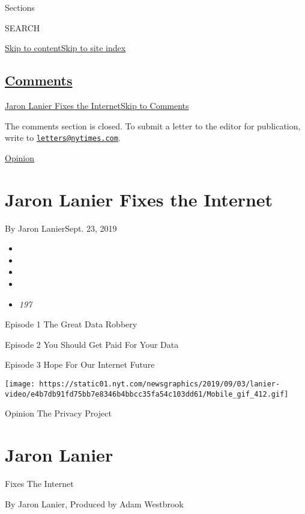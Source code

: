 Sections

SEARCH

\protect\hyperlink{site-content}{Skip to
content}\protect\hyperlink{site-index}{Skip to site index}

\hypertarget{comments}{%
\subsection{\texorpdfstring{\protect\hyperlink{commentsContainer}{Comments}}{Comments}}\label{comments}}

\href{}{Jaron Lanier Fixes the Internet}\href{}{Skip to Comments}

The comments section is closed. To submit a letter to the editor for
publication, write to
\href{mailto:letters@nytimes.com}{\nolinkurl{letters@nytimes.com}}.

\href{/section/opinion}{Opinion}

\hypertarget{jaron-lanier-fixes-the-internet}{%
\section{Jaron Lanier Fixes the
Internet}\label{jaron-lanier-fixes-the-internet}}

By Jaron LanierSept. 23, 2019

\begin{itemize}
\item
\item
\item
\item
\item
  \emph{197}
\end{itemize}

 Episode 1 The Great Data Robbery

 Episode 2 You Should Get Paid For Your Data

 Episode 3 Hope For Our Internet Future

\texttt{[image: https://static01.nyt.com/newsgraphics/2019/09/03/lanier-video/e4b7db91fd75bb7e8346b4bbcc35fa54c103dd61/Mobile\_gif\_412.gif]}

Opinion \textbar{} The Privacy Project

\hypertarget{jaron-lanier}{%
\section{Jaron Lanier}\label{jaron-lanier}}

Fixes The Internet

By Jaron Lanier, Produced by Adam Westbrook

